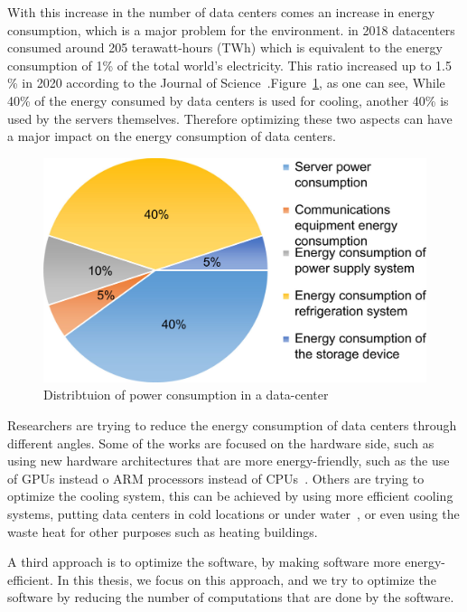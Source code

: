 With this increase in the number of data centers comes an increase in energy consumption, which is a major problem for the environment. 
in 2018 datacenters consumed around 205 terawatt-hours (TWh)\cite{schneider2021world} which is equivalent to the energy consumption of 1\% of the total world's electricity. This ratio increased up to 1.5 \% in 2020 according to the Journal of Science~\cite{mytton2021data}.Figure~\ref{fig:data_centers_power_distribution}, as one can see, While 40\% of the energy consumed by data centers is used for cooling, another 40\% is used by the servers themselves. Therefore optimizing these two aspects can have a major impact on the energy consumption of data centers.
\begin{figure}[!h]
    \centering
    \includegraphics[width=0.6\linewidth]{chapters/data_centers_power_distribution}
    \caption{Distribtuion of power consumption in a data-center\cite{rong2016optimizing}}
    \label{fig:data_centers_power_distribution}
\end{figure}

Researchers are trying to reduce the energy consumption of data centers through different angles. Some of the works are focused on the hardware side, such as using new hardware architectures that are more energy-friendly, such as the use of GPUs instead o ARM processors instead of CPUs~\cite{aroca2012towards}. Others are trying to optimize the cooling system, this can be achieved by using more efficient cooling systems, putting data centers in cold locations or under water~\cite{simon2018project}, or even using the waste heat for other purposes such as heating buildings\cite{bouzel2021distributed,cao2021carbon}. 

A third approach is to optimize the software, by making software more energy-efficient. In this thesis, we focus on this approach, and we try to optimize the software by reducing the number of computations that are done by the software. 

